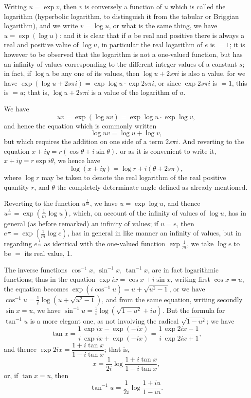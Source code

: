 \documentclass[11pt,a4paper]{book}
\begin{document}
Writing $u = \exp v$, then $v$ is conversely a function of $u$ which is called the logarithm (hyperbolic logarithm, to distinguish it from the tabular or Briggian logarithm), and we write $v = \log u$, or what is the same thing, we have $u = \exp(\log u)$: and it is clear that if $u$ be real and positive there is always a real and positive value of $\log u$, in particular the real logarithm of $e$ is $= 1$; it is however to be observed that the logarithm is not a one-valued function, but has an infinity of values corresponding to the different integer values of a constant $s$; in fact, if $\log u$ be any one of its values, then $\log u + 2s\pi i$ is also a value, for we have $\exp(\log u + 2s\pi i) = \exp\log u \cdot \exp 2s\pi i$, or since $\exp 2s\pi i$ is $= 1$, this is $= u$; that is, $\log u + 2s\pi i$ is a value of the logarithm of $u$.

We have
\[
uv = \exp(\log uv) = \exp\log u \cdot \exp\log v,
\]
and hence the equation which is commonly written
\[
\log uv = \log u + \log v,
\]
but which requires the addition on one side of a term $2s\pi i$. And reverting to the equation $x + iy = r(\cos\theta + i\sin\theta)$, or as it is convenient to write it, $x + iy = r\exp i\theta$, we hence have
\[
\log(x + iy) = \log r + i(\theta + 2s\pi),
\]
where $\log r$ may be taken to denote the real logarithm of the real positive quantity $r$, and $\theta$ the completely determinate angle defined as already mentioned.

Reverting to the function $u^{\frac{1}{m}}$, we have $u = \exp\log u$, and thence $u^{\frac{1}{m}} = \exp(\frac{1}{m}\log u)$, which, on account of the infinity of values of $\log u$, has in general (as before remarked) an infinity of values; if $u = e$, then $e^{\frac{1}{m}} = \exp(\frac{1}{m}\log e)$, has in general in like manner an infinity of values, but in regarding $e^{\frac{1}{m}}$ as identical with the one-valued function $\exp\frac{1}{m}$, we take $\log e$ to be $=$ its real value, 1.

The inverse functions $\cos^{-1}x$, $\sin^{-1}x$, $\tan^{-1}x$, are in fact logarithmic functions; thus in the equation $\exp ix = \cos x + i\sin x$, writing first $\cos x = u$, the equation becomes $\exp(i\cos^{-1}u) = u + \sqrt{u^{2} - 1}$, or we have $\cos^{-1}u = \frac{1}{i}\log(u + \sqrt{u^{2} - 1})$, and from the same equation, writing secondly $\sin x = u$, we have $\sin^{-1}u = \frac{1}{i}\log(\sqrt{1 - u^{2}} + iu)$. But the formula for $\tan^{-1}u$ is a more elegant one, as not involving the radical $\sqrt{1 - u^{2}}$; we have
\[
\tan x = \frac{1}{i}\frac{\exp ix - \exp(-ix)}{\exp ix + \exp(-ix)} = \frac{1}{i}\frac{\exp 2ix - 1}{\exp 2ix + 1},
\]
and thence $\exp 2ix = \dfrac{1 + i\tan x}{1 - i\tan x}$; that is,
\[
x = \frac{1}{2i}\log\frac{1 + i\tan x}{1 - i\tan x},
\]
or, if $\tan x = u$, then
\[
\tan^{-1}u = \frac{1}{2i}\log\frac{1 + iu}{1 - iu}.
\]
\end{document}

